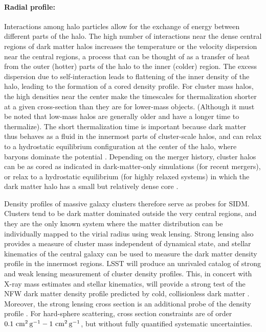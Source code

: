 \paragraph{Radial profile:} Interactions among halo particles allow for the exchange of energy between different parts of the halo. The high number of interactions near the dense central regions of dark matter halos increases the temperature or the velocity dispersion near the central regions, a process that can be thought of as a transfer of heat from the outer (hotter) parts of the halo to the inner (colder) region. The excess dispersion due to self-interaction leads to flattening of the inner density of the halo, leading to the formation of a cored density profile. For cluster mass halos, the high densities near the center make the timescales for thermalization shorter at a given cross-section than they are for lower-mass objects. (Although it must be noted that low-mass halos are generally older and have a longer time to thermalize).  The short thermalization time is important because dark matter thus behaves as a fluid in the innermost parts of cluster-scale halos, and can relax to a hydrostatic equilibrium configuration at the center of the halo, where baryons dominate the potential \citep{Kaplinghat:2015aga}.  Depending on the merger history, cluster halos can be as cored as indicated in dark-matter-only simulations (for recent mergers), or relax to a hydrostatic equilibrium (for highly relaxed systems) in which the dark matter halo has a small but relatively dense core \citep{Robertson:2017mgj}.

Density profiles of massive galaxy clusters therefore serve as probes for SIDM. Clusters tend to be dark matter dominated outside the very central regions, and they are the only known system where the matter distribution can be individually mapped to the virial radius using weak lensing. Strong lensing also provides a measure of cluster mass independent of dynamical state, and stellar kinematics of the central galaxy can be used to measure the dark matter density profile in the innermost regions. LSST will produce an unrivaled catalog of strong and weak lensing measurement of cluster density profiles. This, in concert with X-ray mass estimates and stellar kinematics, will provide a strong test of the NFW dark matter density profile predicted by cold, collisionless dark matter \citep{Newman:2013,Kaplinghat:2015aga,Robertson:2018anx,Andrade:2019wzn}. Moreover, the strong lensing cross section is an additional probe of the density profile \citep{Robertson:2018anx}.  For hard-sphere scattering, cross section constraints are of order $0.1\mathrm{\,\mathrm{\,cm}^2\mathrm{\,g}^{-1}}-1\mathrm{\,\mathrm{\,cm}^2\mathrm{\,g}^{-1}}$, but without fully quantified systematic uncertainties.

